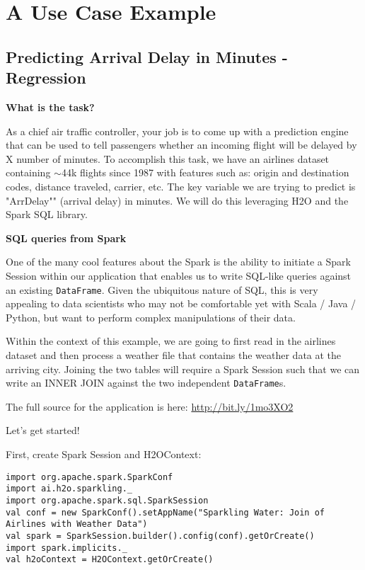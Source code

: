 \section{A Use Case Example}


\subsection{Predicting Arrival Delay in Minutes - Regression}

\textbf{What is the task?}

As a chief air traffic controller, your job is to come up with a prediction engine that can be used to tell
passengers whether an incoming flight will be delayed by X number of minutes. To accomplish this task, we have an
airlines dataset containing ${\sim}$44k flights since 1987 with features such as: origin and destination codes,
distance traveled, carrier, etc.  The key variable we are trying to predict is "ArrDelay"" (arrival delay) in
minutes. We will do this leveraging H2O and the Spark SQL library.

\textbf{SQL queries from Spark}

One of the many cool features about the Spark is the ability to initiate a Spark Session within our
application that enables us to write SQL-like queries against an existing \texttt{DataFrame}. Given the ubiquitous
nature of SQL, this is very appealing to data scientists who may not be comfortable yet with Scala / Java / Python, but
want to perform complex manipulations of their data.

Within the context of this example, we are going to first read in the airlines dataset and then process a weather
file that contains the weather data at the arriving city. Joining the two tables will require a Spark Session such that
we can write an INNER JOIN against the two independent \texttt{DataFrame}s.

The full source for the application is here: \url{http://bit.ly/1mo3XO2}

Let's get started!

First, create Spark Session and H2OContext:

\begin{lstlisting}[style=Scala]
import org.apache.spark.SparkConf
import ai.h2o.sparkling._
import org.apache.spark.sql.SparkSession
val conf = new SparkConf().setAppName("Sparkling Water: Join of Airlines with Weather Data")
val spark = SparkSession.builder().config(conf).getOrCreate()
import spark.implicits._
val h2oContext = H2OContext.getOrCreate()
\end{lstlisting}

